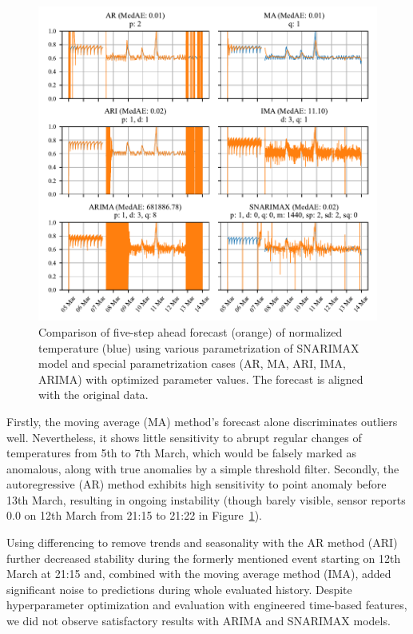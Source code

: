 \documentclass{article}
\begin{document}
\begin{enumerate}
        \begin{figure}[htbp]
          \centerline{\includegraphics[width=\textwidth]{ARIMA_opt_results.pdf}}
          \caption{Comparison of five-step ahead forecast (orange) of normalized temperature (blue) using various parametrization of SNARIMAX model and special parametrization cases (AR, MA, ARI, IMA, ARIMA) with optimized parameter values. The forecast is aligned with the original data.}
          \label{fig:snarimax}
        \end{figure}

        Firstly, the moving average (MA) method's forecast alone discriminates outliers well. Nevertheless, it shows little sensitivity to abrupt regular changes of temperatures from 5th to 7th March, which would be falsely marked as anomalous, along with true anomalies by a simple threshold filter. Secondly, the autoregressive (AR) method exhibits high sensitivity to point anomaly before 13th March, resulting in ongoing instability (though barely visible, sensor reports 0.0 on 12th March from 21:15 to 21:22 in Figure~\ref{fig:snarimax}).

        Using differencing to remove trends and seasonality with the AR method (ARI) further decreased stability during the formerly mentioned event starting on 12th March at 21:15 and, combined with the moving average method (IMA), added significant noise to predictions during whole evaluated history. Despite hyperparameter optimization and evaluation with engineered time-based features, we did not observe satisfactory results with ARIMA and SNARIMAX models.


\end{enumerate}
\end{document}
